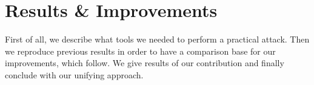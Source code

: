 \chapter{Results \& Improvements}
\label{chap:results}

First of all, we describe what tools we needed to perform a practical attack. Then we reproduce previous results in order to have a comparison base for our improvements, which follow. We give results of our contribution and finally conclude with our unifying approach.







